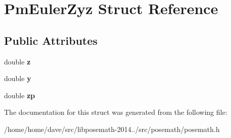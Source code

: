\hypertarget{structPmEulerZyz}{}\section{Pm\+Euler\+Zyz Struct Reference}
\label{structPmEulerZyz}
\subsection*{Public Attributes}
\begin{DoxyCompactItemize}
\item 
\hypertarget{structPmEulerZyz_aca652d0f1857cc5de5091226e92d558c}{}double {\bfseries z}\label{structPmEulerZyz_aca652d0f1857cc5de5091226e92d558c}

\item 
\hypertarget{structPmEulerZyz_ac60535f04b17bbaffc8314eb277e49a7}{}double {\bfseries y}\label{structPmEulerZyz_ac60535f04b17bbaffc8314eb277e49a7}

\item 
\hypertarget{structPmEulerZyz_abe2ad8e53ce0d8c01129de13b64aa580}{}double {\bfseries zp}\label{structPmEulerZyz_abe2ad8e53ce0d8c01129de13b64aa580}

\end{DoxyCompactItemize}


The documentation for this struct was generated from the following file\+:\begin{DoxyCompactItemize}
\item 
/home/home/dave/src/libposemath-\/2014../src/posemath/posemath.\+h\end{DoxyCompactItemize}
